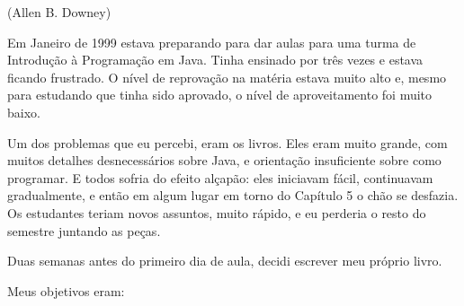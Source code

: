(Allen B. Downey)


Em Janeiro de 1999 estava preparando para dar aulas para uma turma de 
Introdução à Programação em Java. Tinha ensinado por três vezes e estava 
ficando frustrado. O nível de reprovação na matéria estava muito alto e, 
mesmo para estudando que tinha sido aprovado, o nível de aproveitamento foi 
muito baixo.


Um dos problemas que eu percebi, eram os livros. Eles eram muito grande, com 
muitos detalhes desnecessários sobre Java, e orientação insuficiente sobre 
como programar. E todos sofria do efeito alçapão: eles iniciavam fácil, 
continuavam gradualmente, e então em algum lugar em torno do Capítulo 5 o 
chão se desfazia. Os estudantes teriam novos assuntos, muito rápido, e eu 
perderia o resto do semestre juntando as peças.

Duas semanas antes do primeiro dia de aula, decidi escrever meu próprio livro.

Meus objetivos eram:

